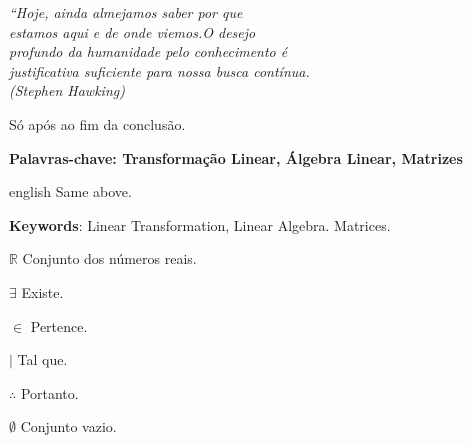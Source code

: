 \documentclass[
12pt,
 a4paper,
    english,
    brazil,
    oneside
    ]{abntex2}
\begin{document}
	\begin{epigrafe}
		\vspace*{\fill}
		\begin{flushright}
			\textit{``Hoje, ainda almejamos saber por que\\
				estamos aqui e de onde viemos.O desejo\\
				profundo da humanidade pelo	conhecimento é\\
				justificativa suficiente para nossa busca contínua.\\
				(Stephen Hawking)}
		\end{flushright}
	\end{epigrafe}
	
	
	\setlength{\absparsep}{18pt} %
	\begin{resumo}
		Só após ao fim da conclusão.
		
		\textbf{Palavras-chave: Transformação Linear, Álgebra Linear, Matrizes}
	\end{resumo}
		
	
	\begin{resumo}[Abstract]
		\begin{otherlanguage*}{english}
			Same above.
			
			\vspace{\onelineskip}
			
			\noindent 
			\textbf{Keywords}: Linear Transformation, Linear Algebra. Matrices.
		\end{otherlanguage*}
	\end{resumo}
	
	\listoftables*
	\cleardoublepage
	
	\begin{simbolos}
		\item[$ \mathbb{R} $] Conjunto dos números reais.
		\item[$\exists$] Existe.
		\item[$\in$] Pertence.
		\item[$\mid$] Tal que.
		\item[$\therefore$] Portanto.
		\item[$\emptyset$] Conjunto vazio.
	\end{simbolos}
	
	
	\tableofcontents*
	\cleardoublepage
	
	
	\textual
	
	
		
	
	
	
	
	
	
	
		
	
	

		
\end{document}
